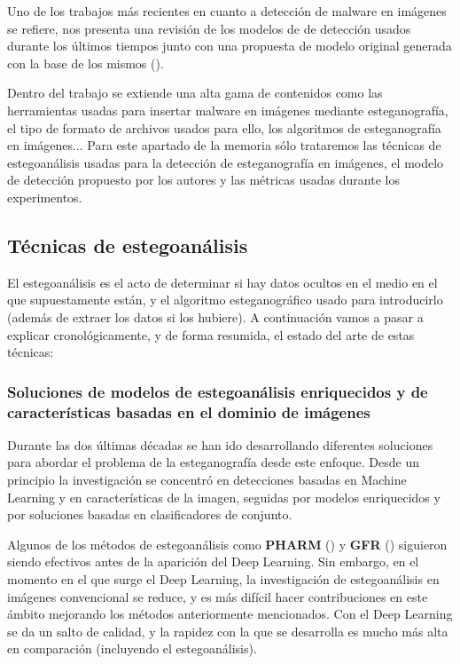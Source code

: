 Uno de los trabajos más recientes en cuanto a detección de malware en imágenes se refiere, nos presenta una revisión de los modelos de de detección usados durante los últimos tiempos junto con una propuesta de modelo original generada con la base de los mismos (\cite{stegomalware}). %

Dentro del trabajo se extiende una alta gama de contenidos como las herramientas usadas para insertar malware en imágenes mediante esteganografía, el tipo de formato de archivos usados para ello, los algoritmos de esteganografía en imágenes... Para este apartado de la memoria sólo trataremos las técnicas de estegoanálisis usadas para la detección de esteganografía en imágenes, el modelo de detección propuesto por los autores y las métricas usadas durante los experimentos.

\subsection{Técnicas de estegoanálisis}

El estegoanálisis es el acto de determinar si hay datos ocultos en el medio en el que supuestamente están, y el algoritmo esteganográfico usado para introducirlo (además de extraer los datos si los hubiere). A continuación vamos a pasar a explicar cronológicamente, y de forma resumida, el estado del arte de estas técnicas:

\subsubsection{Soluciones de modelos de estegoanálisis enriquecidos y de características basadas en el dominio de imágenes}

Durante las dos últimas décadas se han ido desarrollando diferentes soluciones para abordar el problema de la esteganografía desde este enfoque. Desde un principio la investigación se concentró en detecciones basadas en Machine Learning y en características de la imagen, seguidas por modelos enriquecidos y por soluciones basadas en clasificadores de conjunto. 

Algunos de los métodos de estegoanálisis como \textbf{PHARM} (\cite{pharm}) y \textbf{GFR} (\cite{gfr}) siguieron siendo efectivos antes de la aparición del Deep Learning. Sin embargo, en el momento en el que surge el Deep Learning, la investigación de estegoanálisis en imágenes convencional se reduce, y es más difícil hacer contribuciones en este ámbito mejorando los métodos anteriormente mencionados. Con el Deep Learning se da un salto de calidad, y la rapidez con la que se desarrolla es mucho más alta en comparación (incluyendo el estegoanálisis). %

